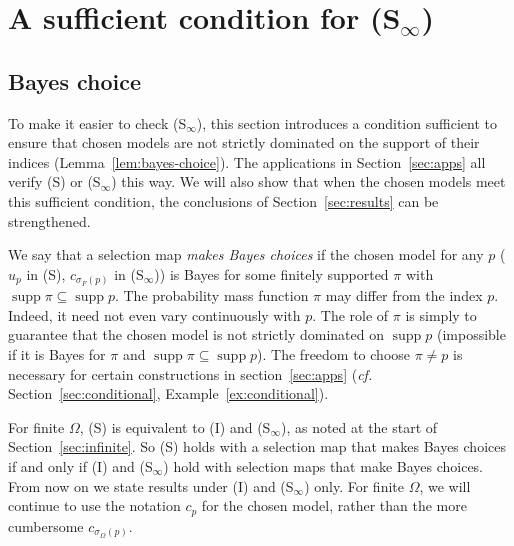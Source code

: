 \documentclass[11pt]{article}
\theoremstyle{definition}
\theoremstyle{remark}
\newcommand{\supp}{\operatorname{supp}}
\begin{document}
\section{A sufficient condition for (S$_\infty$)}\label{sec:strict}


\subsection{Bayes choice}

To make it easier to check (S$_\infty$), this section introduces a condition sufficient to ensure that chosen models are not strictly dominated on the support of their indices (Lemma~\ref{lem:bayes-choice}). The applications in Section~\ref{sec:apps} all verify (S) or (S$_\infty$) this way. We will also show that when the chosen models meet this sufficient condition, the conclusions of Section~\ref{sec:results} can be strengthened.



We say that a selection map \emph{makes Bayes choices} if the chosen model for any $p$ ($u_p$ in (S), $c_{\sigma_F(p)}$ in (S$_\infty$)) is Bayes for some finitely supported $\pi$ with $\supp\pi\subseteq\supp p$. The probability mass function $\pi$ may differ from the index $p$. Indeed, it need not even vary continuously with $p$. The role of $\pi$ is simply to guarantee that the chosen model is not strictly dominated on $\supp p$ (impossible if it is Bayes for $\pi$ and $\supp\pi\subseteq\supp p$). The freedom to choose $\pi\ne p$ is necessary for certain constructions in section~\ref{sec:apps} (\textit{cf.} Section~\ref{sec:conditional}, Example~\ref{ex:conditional}).

For finite $\Omega$, (S) is equivalent to (I) and (S$_\infty$), as noted at the start of Section~\ref{sec:infinite}. So (S) holds with a selection map that makes Bayes choices if and only if (I) and (S$_\infty$) hold with selection maps that make Bayes choices. From now on we state results under (I) and (S$_\infty$) only. For finite $\Omega$, we will continue to use the notation $c_p$ for the chosen model, rather than the more cumbersome $c_{\sigma_\Omega(p)}$. 
\end{document}
